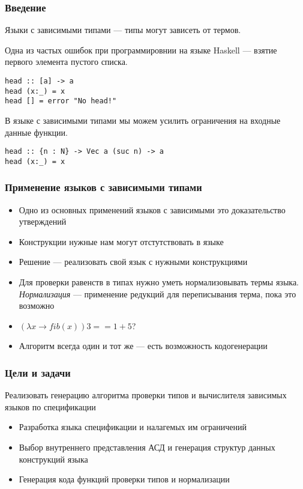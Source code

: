 
\begin{frame}[fragile]
\frametitle{Введение}

Языки с зависимыми типами --- типы могут зависеть от термов.

Одна из частых ошибок при программировнии на языке Haskell --- взятие первого элемента пустого списка.

\begin{verbatim}
head :: [a] -> a
head (x:_) = x
head [] = error "No head!"
\end{verbatim}

В языке с зависимыми типами мы можем усилить ограничения на входные данные функции.

\begin{verbatim}
head :: {n : N} -> Vec a (suc n) -> a
head (x:_) = x
\end{verbatim}

\end{frame}

\begin{frame}
\frametitle{Применение языков с зависимыми типами}

\begin{itemize}
\item Одно из основных применений языков с зависимыми это доказательство утверждений
\item Конструкции нужные нам могут отстутствовать в языке
\item Решение --- реализовать свой язык с нужными конструкциями
\item Для проверки равенств в типах нужно уметь нормализовывать термы языка.
\textit{Нормализация} --- применение редукций для переписывания терма, пока это возможно
\item $(\lambda x \rightarrow fib(x)) 3 == 1 + 5$?
\item Алгоритм всегда один и тот же --- есть возможность кодогенерации
\end{itemize}
\end{frame}

\begin{frame}
\frametitle{Цели и задачи}
Реализовать генерацию алгоритма проверки типов и вычислителя зависимых языков по спецификации

\begin{itemize}
\item Разработка языка спецификации и налагемых им ограничений
\item Выбор внутреннего представления АСД и генерация структур данных конструкций языка
\item Генерация кода функций проверки типов и нормализации
\end{itemize}
\end{frame}

